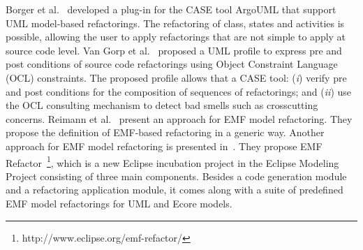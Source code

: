 Borger et al.~\cite{Boger2002} developed a plug-in for the CASE tool ArgoUML that support UML model-based refactorings. The refactoring of class, states and activities is possible, allowing the user to apply refactorings that are not simple to apply at source code level.
Van Gorp et al.~\cite{Gorp03towardsautomating} proposed a UML profile to express pre and post conditions of source code refactorings using Object Constraint Language (OCL) constraints. The proposed profile allows that a CASE tool: (\textit{i}) verify pre and post conditions for the composition of sequences of refactorings; and (\textit{ii}) use the OCL consulting mechanism to detect bad smells such as crosscutting concerns.  Reimann et al.~\cite{Models2010} present an approach for EMF model refactoring. They propose the definition of EMF-based refactoring in a generic way. Another approach for EMF model refactoring is presented in~\cite{ModelsEMFREfactorin}. They propose EMF Refactor~\footnote{http://www.eclipse.org/emf-refactor/}, which is a new Eclipse incubation project in the Eclipse Modeling Project consisting of three main components. Besides a code generation module and a refactoring application module, it comes along with a suite of predefined EMF model refactorings for UML and Ecore models.

